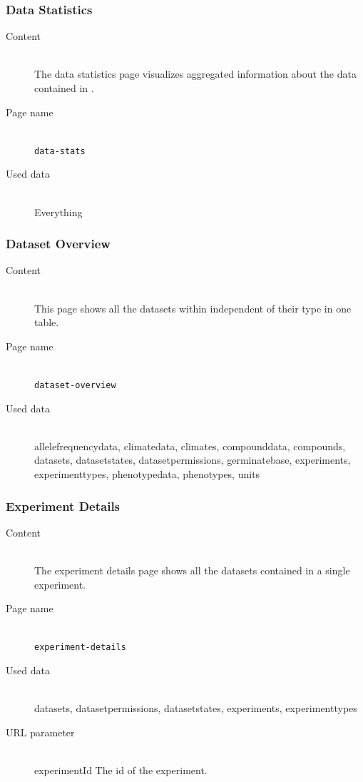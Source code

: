\subsubsection{Data Statistics}
\begin{description}
	\item[Content]\hfill\\The data statistics page visualizes aggregated information about the data contained in {\germinate}.
	\item[Page name]\hfill\\\texttt{data-stats}
	\item[Used data]\hfill\\Everything
\end{description}

\subsubsection{Dataset Overview}
\begin{description}
	\item[Content]\hfill\\This page shows all the datasets within {\germinate} independent of their type in one table.
	\item[Page name]\hfill\\\texttt{dataset-overview}
	\item[Used data]\hfill\\allelefrequencydata, climatedata, climates, compounddata, compounds, datasets, datasetstates, datasetpermissions, germinatebase, experiments, experimenttypes, phenotypedata, phenotypes, units
\end{description}

\subsubsection{Experiment Details}
\begin{description}
	\item[Content]\hfill\\The experiment details page shows all the datasets contained in a single experiment.
	\item[Page name]\hfill\\\texttt{experiment-details}
	\item[Used data]\hfill\\datasets, datasetpermissions, datasetstates, experiments, experimenttypes
	\item[URL parameter]\hfill\\experimentId The id of the experiment.
\end{description}

